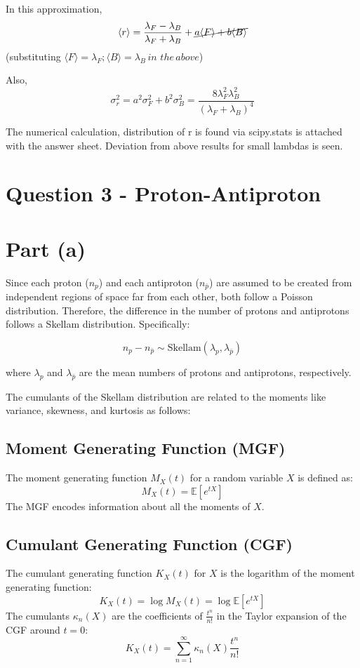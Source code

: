 \documentclass[11pt]{article}
\begin{document}
	In this approximation,\\
	\[
		\langle r \rangle = \frac{\lambda_F-\lambda_B}{\lambda_F + \lambda_B} + \cancel{a\langle F \rangle + b \langle B \rangle}
	\](substituting $\langle F \rangle = \lambda_{F} 
	; \langle B \rangle = \lambda_B \,in \, \, the \, above$)
	
	Also,
	\[
		\sigma_r^2 = a^2 \sigma_F^2 + b^2 \sigma_B^2 = \frac{8\lambda_F^2 \lambda_B^2}{(\lambda_F + \lambda_B)^4} 	
	\]
	
	The numerical calculation, distribution of r is found via scipy.stats is attached with the answer sheet. Deviation from above results for small lambdas is seen.
	
\section*{\color{teal} Question 3 - Proton-Antiproton}	
		
		\section*{Part (a)}
		
		Since each proton (\(n_p\)) and each antiproton (\(n_{\bar{p}}\)) are assumed to be created from independent regions of space far from each other, both follow a Poisson distribution. Therefore, the difference in the number of protons and antiprotons follows a Skellam distribution. Specifically:
		
		\[
		n_p - n_{\bar{p}} \sim \text{Skellam}(\lambda_p, \lambda_{\bar{p}})
		\]
		
		where \( \lambda_p \) and \( \lambda_{\bar{p}} \) are the mean numbers of protons and antiprotons, respectively.
		
		The cumulants of the Skellam distribution are related to the moments like variance, skewness, and kurtosis as follows:
			
		\subsection*{Moment Generating Function (MGF)}
		The moment generating function \( M_X(t) \) for a random variable \( X \) is defined as:
		\[
		M_X(t) = \mathbb{E}[e^{tX}]
		\]
		The MGF encodes information about all the moments of \( X \).
			
		\subsection*{Cumulant Generating Function (CGF)}
		The cumulant generating function \( K_X(t) \) for \( X \) is the logarithm of the moment generating function:
		\[
		K_X(t) = \log M_X(t) = \log \mathbb{E}[e^{tX}]
		\]
		The cumulants \( \kappa_n(X) \) are the coefficients of \( \frac{t^n}{n!} \) in the Taylor expansion of the CGF around \( t = 0 \):
		\[
		K_X(t) = \sum_{n=1}^{\infty} \kappa_n(X) \frac{t^n}{n!}
		\]
			
\end{document}
